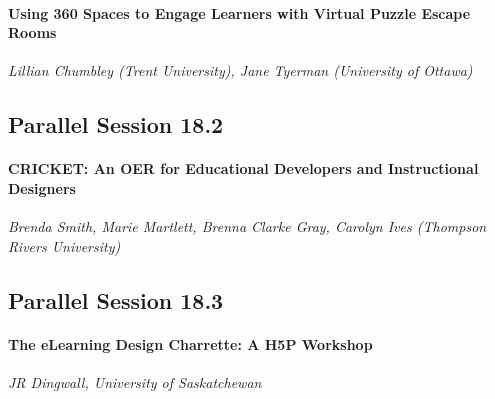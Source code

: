 \documentclass[
]{book}
\begin{document}
\begin{todo}
\hypertarget{using-360-spaces-to-engage-learners-with-virtual-puzzle-escape-rooms}{%
\paragraph{Using 360 Spaces to Engage Learners with Virtual Puzzle
Escape
Rooms}\label{using-360-spaces-to-engage-learners-with-virtual-puzzle-escape-rooms}}

\emph{Lillian Chumbley (Trent University), Jane Tyerman (University of
Ottawa)}
\end{todo}

\hypertarget{parallel-session-18.2}{%
\subsection*{Parallel Session 18.2}\label{parallel-session-18.2}}

\begin{todo}
\hypertarget{cricket-an-oer-for-educational-developers-and-instructional-designers}{%
\paragraph{CRICKET: An OER for Educational Developers and Instructional
Designers}\label{cricket-an-oer-for-educational-developers-and-instructional-designers}}

\emph{Brenda Smith, Marie Martlett, Brenna Clarke Gray, Carolyn Ives
(Thompson Rivers University)}
\end{todo}

\hypertarget{parallel-session-18.3}{%
\subsection*{Parallel Session 18.3}\label{parallel-session-18.3}}

\begin{todo}
\hypertarget{the-elearning-design-charrette-a-h5p-workshop}{%
\paragraph{The eLearning Design Charrette: A H5P
Workshop}\label{the-elearning-design-charrette-a-h5p-workshop}}

\emph{JR Dingwall, University of Saskatchewan}
\end{todo}
\end{document}
